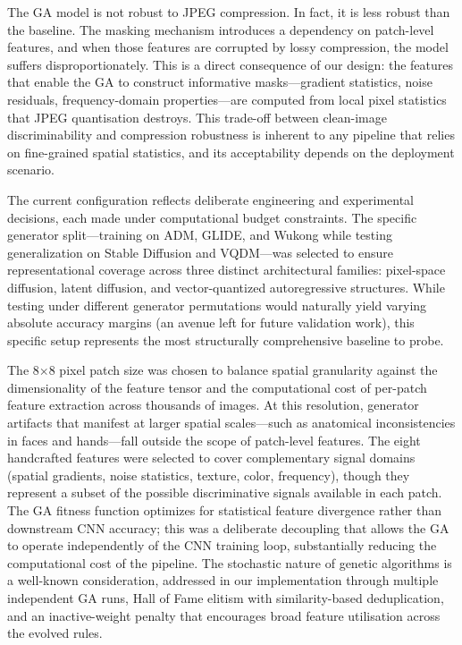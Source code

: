 \documentclass[runningheads]{llncs}
\begin{document}
The GA model is not robust to JPEG compression. In fact, it is less robust than the baseline. The masking mechanism introduces a dependency on patch-level features, and when those features are corrupted by lossy compression, the model suffers disproportionately. This is a direct consequence of our design: the features that enable the GA to construct informative masks---gradient statistics, noise residuals, frequency-domain properties---are computed from local pixel statistics that JPEG quantisation destroys. This trade-off between clean-image discriminability and compression robustness is inherent to any pipeline that relies on fine-grained spatial statistics, and its acceptability depends on the deployment scenario.

The current configuration reflects deliberate engineering and experimental decisions, each made under computational budget constraints. The specific generator split—training on ADM, GLIDE, and Wukong while testing generalization on Stable Diffusion and VQDM—was selected to ensure representational coverage across three distinct architectural families: pixel-space diffusion, latent diffusion, and vector-quantized autoregressive structures. While testing under different generator permutations would naturally yield varying absolute accuracy margins (an avenue left for future validation work), this specific setup represents the most structurally comprehensive baseline to probe.

The 8$\times$8 pixel patch size was chosen to balance spatial granularity against the dimensionality of the feature tensor and the computational cost of per-patch feature extraction across thousands of images. At this resolution, generator artifacts that manifest at larger spatial scales---such as anatomical inconsistencies in faces and hands---fall outside the scope of patch-level features. The eight handcrafted features were selected to cover complementary signal domains (spatial gradients, noise statistics, texture, color, frequency), though they represent a subset of the possible discriminative signals available in each patch. The GA fitness function optimizes for statistical feature divergence rather than downstream CNN accuracy; this was a deliberate decoupling that allows the GA to operate independently of the CNN training loop, substantially reducing the computational cost of the pipeline. The stochastic nature of genetic algorithms is a well-known consideration, addressed in our implementation through multiple independent GA runs, Hall of Fame elitism with similarity-based deduplication, and an inactive-weight penalty that encourages broad feature utilisation across the evolved rules.
\end{document}
